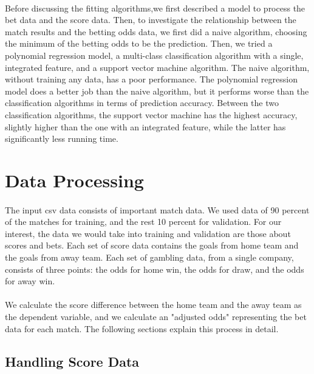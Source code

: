\documentclass[12pt]{article}
\begin{document}
\paragraph{}
Before discussing the fitting algorithms,we first described a model to process the bet data and the score data. Then, to investigate the relationship between the match results and the betting odds data, we first did a naive algorithm, choosing the minimum of the betting odds to be the prediction. Then, we tried a polynomial regression model, a multi-class classification algorithm with a single, integrated feature, and a support vector machine algorithm. The naive algorithm, without training any data, has a poor performance. The polynomial regression model does a better job than the naive algorithm, but it performs worse than the classification algorithms in terms of prediction accuracy. Between the two classification algorithms, the support vector machine has the highest accuracy, slightly higher than the one with an integrated feature, while the latter has significantly less running time.


\section{Data Processing}
\paragraph{}
The input csv data consists of important match data. We used data of 90 percent of the matches for training, and the rest 10 percent for validation. For our interest, the data we would take into training and validation are those about scores and bets. Each set of score data contains the goals from home team and the goals from away team. Each set of gambling data, from a single company, consists of three points: the odds for home win, the odds for draw, and the odds for away win.
\paragraph{}
 We calculate the score difference between the home team and the away team as the dependent variable, and we calculate an "adjusted odds" representing the bet data for each match. The following sections explain this process in detail.

\subsection{Handling Score Data}
\end{document}
